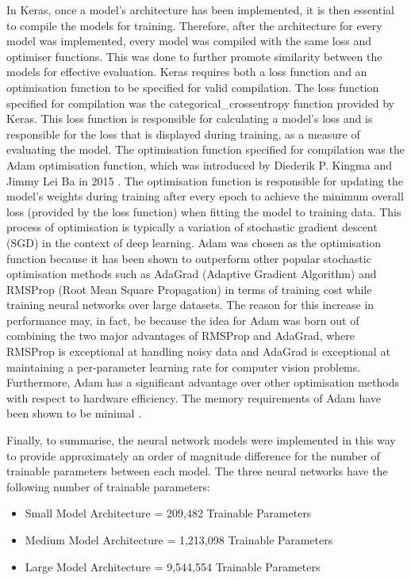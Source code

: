 \documentclass{l4proj}
\begin{document}
In Keras, once a model's architecture has been implemented, it is then essential to compile the models for training.
Therefore, after the architecture for every model was implemented, every model was compiled with the same loss and optimiser functions.
This was done to further promote similarity between the models for effective evaluation.
Keras requires both a loss function and an optimisation function to be specified for valid compilation.
The loss function specified for compilation was the categorical\_crossentropy function provided by Keras.
This loss function is responsible for calculating a model's loss and is responsible for the loss that is displayed during training, as a measure of evaluating the model.
The optimisation function specified for compilation was the Adam optimisation function, which was introduced by Diederik P. Kingma and Jimmy Lei Ba in 2015 \cite{DBLP:journals/corr/KingmaB14}.
The optimisation function is responsible for updating the model's weights during training after every epoch to achieve the minimum overall loss (provided by the loss function) when fitting the model to training data.
This process of optimisation is typically a variation of stochastic gradient descent (SGD) in the context of deep learning.
Adam was chosen as the optimisation function because it has been shown to outperform other popular stochastic optimisation methods such as AdaGrad (Adaptive Gradient Algorithm) \cite{Duchi:2011:ASM:1953048.2021068} and RMSProp (Root Mean Square Propagation) \cite{Tieleman2012} in terms of training cost while training neural networks over large datasets.
The reason for this increase in performance may, in fact, be because the idea for Adam was born out of combining the two major advantages of RMSProp and AdaGrad, where RMSProp is exceptional at handling noisy data and AdaGrad is exceptional at maintaining a per-parameter learning rate for computer vision problems. 
Furthermore, Adam has a significant advantage over other optimisation methods with respect to hardware efficiency.
The memory requirements of Adam have been shown to be minimal \cite{DBLP:journals/corr/KingmaB14}.

Finally, to summarise, the neural network models were implemented in this way to provide approximately an order of magnitude difference for the number of trainable parameters between each model.
The three neural networks have the following number of trainable parameters: 
\begin{itemize}
	\item Small Model Architecture = 209,482 Trainable Parameters
	\item Medium Model Architecture = 1,213,098 Trainable Parameters
	\item Large Model Architecture = 9,544,554 Trainable Parameters
\end{itemize}
\end{document}
